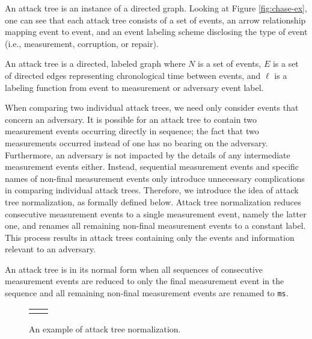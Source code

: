 \documentclass[runningheads]{llncs}
\theoremstyle{definition}
\begin{document}
An attack tree is an instance of a directed graph. Looking at Figure \ref{fig:chase-ex}, one can see that each attack tree consists of a set of events, an arrow relationship mapping event to event, and an event labeling scheme disclosing the type of event (i.e., measurement, corruption, or repair).

\begin{definition}
    An attack tree is a directed, labeled graph where $N$ is a set of events, $E$ is a set of directed edges representing chronological time between events, and $\ell$ is a labeling function from event to measurement or adversary event label.
\end{definition}

When comparing two individual attack trees, we need only consider events that concern an adversary. It is possible for an attack tree to contain two measurement events occurring directly in sequence; the fact that two measurements occurred instead of one has no bearing on the adversary. Furthermore, an adversary is not impacted by the details of any intermediate measurement events either. Instead, sequential measurement events and specific names of non-final measurement events only introduce unnecessary complications in comparing individual attack trees. Therefore, we introduce the idea of attack tree normalization, as formally defined below. Attack tree normalization reduces consecutive measurement events to a single measurement event, namely the latter one, and renames all remaining non-final measurement events to a constant label. This process results in attack trees containing only the events and information relevant to an adversary. 


\begin{definition}
    An attack tree is in its normal form when all sequences of consecutive measurement events are reduced to only the final measurement event in the sequence and all remaining non-final measurement events are renamed to \texttt{ms}. 
\end{definition}

\begin{figure}[htbp]
  \centering 
  \begin{tabular}{c c}
       &  
  \end{tabular}
  \captionsetup{justification=centering,margin=1cm}
  \caption[Example of attack tree normalization]{An example of attack tree normalization.}
  \label{fig:reduce-ex}
\end{figure}
\end{document}
